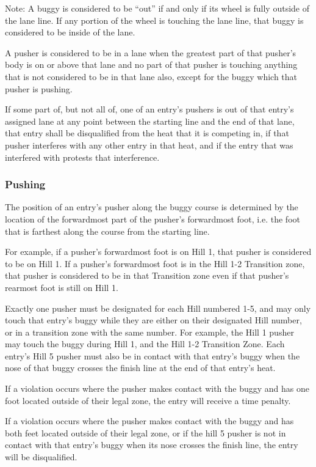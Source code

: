     Note: A buggy is considered to be “out” if and only if its wheel is fully outside of the lane line. If any portion of the wheel is touching the lane line, that buggy is considered to be inside of the lane.

	A pusher is considered to be in a lane when the greatest part of that pusher's body is on or above that lane and no part of that pusher is touching anything that is not considered to be in that lane also, except for the buggy which that pusher is pushing.

	If some part of, but not all of, one of an entry's pushers is out of that entry's assigned lane at any point between the starting line and the end of that lane, that entry shall be disqualified from the heat that it is competing in, if that pusher interferes with any other entry in that heat, and if the entry that was interfered with protests that interference.

\subsubsection{Pushing}

	The position of an entry's pusher along the buggy course is determined by the location of the forwardmost part of the pusher's forwardmost foot, i.e. the foot that is farthest along the course from the starting line.

	For example, if a pusher's forwardmost foot is on Hill 1, that pusher is considered to be on Hill 1. If a pusher's forwardmost foot is in the Hill 1-2 Transition zone, that pusher is considered to be in that Transition zone even if that pusher's rearmost foot is still on Hill 1.

	Exactly one pusher must be designated for each Hill numbered 1-5, and may only touch that entry's buggy while they are either on their designated Hill number, or in a transition zone with the same number. For example, the Hill 1 pusher may touch the buggy during Hill 1, and the Hill 1-2 Transition Zone. Each entry's Hill 5 pusher must also be in contact with that entry's buggy when the nose of that buggy crosses the finish line at the end of that entry's heat.

    If a violation occurs where the pusher makes contact with the buggy and has one foot located outside of their legal zone, the entry will receive a time penalty. 

    If a violation occurs where the pusher makes contact with the buggy and has both feet located outside of their legal zone, or if the hill 5 pusher is not in contact with that entry’s buggy when its nose crosses the finish line, the entry will be disqualified. 


